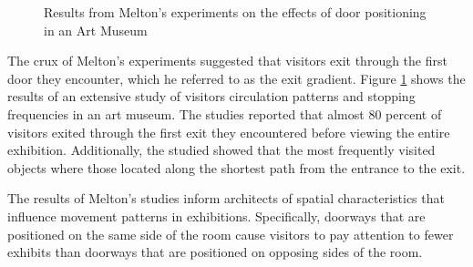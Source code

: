 \documentclass[12pt]{ucthesis}
\begin{document}
\begin{figure}[H]
 \centering
 \hspace{10 mm}
 \label{melton}
 \caption{Results from Melton's experiments on the effects of door positioning in an Art Museum}
\label{Melton-studies}
\end{figure}

The crux of Melton's experiments suggested that visitors exit through the first door they encounter, which he referred to as the exit gradient. Figure \ref{Melton-studies} shows the results of an extensive study of visitors circulation patterns and stopping frequencies in an art museum. The studies reported that almost 80 percent of visitors exited through the first exit they encountered before viewing the entire exhibition. Additionally, the studied showed that the most frequently visited objects where those located along the shortest path from the entrance to the exit. 

The results of Melton's studies inform architects of spatial characteristics that influence movement patterns in exhibitions. Specifically, doorways that are positioned on the same side of the room cause visitors to pay attention to fewer exhibits than doorways that are positioned on opposing sides of the room.
\end{document}
